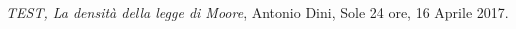 \newpage
\begin{thebibliography}{99}
  \textit{TEST, La densità della legge di Moore},
  Antonio Dini,
  Sole 24 ore,
  16 Aprile 2017.

\end{thebibliography}
